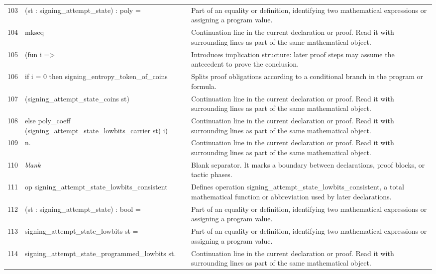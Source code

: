 \documentclass[10pt]{article}
\begin{document}
\begin{longtable}{r L{0.53\textwidth} L{0.37\textwidth}}
103 & {\ttfamily\scriptsize    (st : signing\_attempt\_state) : poly =} & Part of an equality or definition, identifying two mathematical expressions or assigning a program value. \\
104 & {\ttfamily\scriptsize   mkseq} & Continuation line in the current declaration or proof.  Read it with surrounding lines as part of the same mathematical object. \\
105 & {\ttfamily\scriptsize     (fun i =>} & Introduces implication structure: later proof steps may assume the antecedent to prove the conclusion. \\
106 & {\ttfamily\scriptsize       if i = 0 then signing\_entropy\_token\_of\_coins} & Splits proof obligations according to a conditional branch in the program or formula. \\
107 & {\ttfamily\scriptsize         (signing\_attempt\_state\_coins st)} & Continuation line in the current declaration or proof.  Read it with surrounding lines as part of the same mathematical object. \\
108 & {\ttfamily\scriptsize       else poly\_coeff (signing\_attempt\_state\_lowbits\_carrier st) i)} & Continuation line in the current declaration or proof.  Read it with surrounding lines as part of the same mathematical object. \\
109 & {\ttfamily\scriptsize     n.} & Continuation line in the current declaration or proof.  Read it with surrounding lines as part of the same mathematical object. \\
110 & {\ttfamily\scriptsize \emph{blank}} & Blank separator.  It marks a boundary between declarations, proof blocks, or tactic phases. \\
111 & {\ttfamily\scriptsize op signing\_attempt\_state\_lowbits\_consistent} & Defines operation signing\_attempt\_state\_lowbits\_consistent, a total mathematical function or abbreviation used by later declarations. \\
112 & {\ttfamily\scriptsize    (st : signing\_attempt\_state) : bool =} & Part of an equality or definition, identifying two mathematical expressions or assigning a program value. \\
113 & {\ttfamily\scriptsize   signing\_attempt\_state\_lowbits st =} & Part of an equality or definition, identifying two mathematical expressions or assigning a program value. \\
114 & {\ttfamily\scriptsize     signing\_attempt\_state\_programmed\_lowbits st.} & Continuation line in the current declaration or proof.  Read it with surrounding lines as part of the same mathematical object. \\

\end{longtable}
\end{document}
